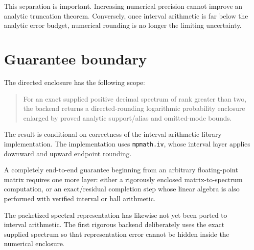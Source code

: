 This separation is important.  Increasing numerical precision cannot improve
an analytic truncation theorem.  Conversely, once interval arithmetic is far
below the analytic error budget, numerical rounding is no longer the limiting
uncertainty.

\section{Guarantee boundary}

The directed enclosure has the following scope:

\begin{quote}
For an exact supplied positive decimal spectrum of rank greater than two, the
backend returns a directed-rounding logarithmic probability enclosure enlarged
by proved analytic support/alias and omitted-mode bounds.
\end{quote}

The result is conditional on correctness of the interval-arithmetic library
implementation.  The implementation uses \texttt{mpmath.iv}, whose
interval layer applies downward and upward endpoint rounding.

A completely end-to-end guarantee beginning from an arbitrary floating-point
matrix requires one more layer: either a rigorously enclosed matrix-to-spectrum
computation, or an exact/residual completion step whose linear algebra is also
performed with verified interval or ball arithmetic.

The packetized spectral representation has likewise not yet been
ported to interval arithmetic.  The first rigorous backend deliberately uses
the exact supplied spectrum so that representation error cannot be hidden
inside the numerical enclosure.



